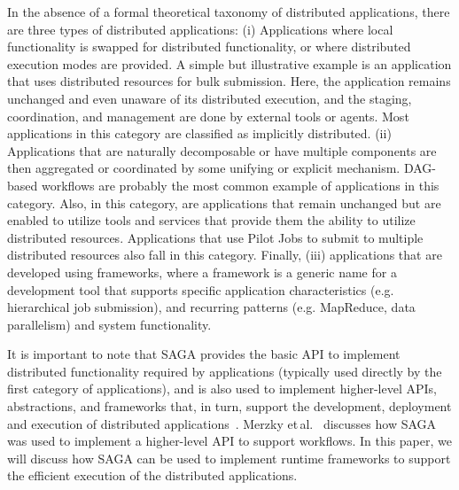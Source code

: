     In the absence of a formal theoretical taxonomy of distributed
    applications, %
    there are three types of distributed applications: (i) Applications
    where local functionality is swapped for distributed functionality,
    or where distributed execution modes are provided.  A simple but
    illustrative example is an application that uses distributed
    resources for bulk submission. Here, the application remains
    unchanged and even unaware of its distributed execution, and the
    staging, coordination, and management are done by external tools or
    agents. Most applications in this category are classified as
    implicitly distributed.  (ii) Applications that are naturally
    decomposable or have multiple components are then aggregated or
    coordinated by some unifying or explicit mechanism.  DAG-based
    workflows are probably the most common example of applications in
    this category. Also, in this category, are applications that remain
    unchanged but are enabled to utilize tools and services that provide
    them the ability to utilize distributed resources.  Applications
    that use Pilot Jobs to submit to multiple distributed resources also
    fall in this category.  Finally, (iii) applications that are
    developed using frameworks, where a framework is a generic name for
    a development tool that supports specific application
    characteristics (e.g. hierarchical job submission), and recurring
    patterns (e.g. MapReduce, data parallelism) and system
    functionality.


    It is important to note that SAGA provides the basic API to
    implement distributed functionality required by applications
    (typically used directly by the first category of applications), and
    is also used to implement higher-level APIs, abstractions, and
    frameworks that, in turn, support the development, deployment and
    execution of distributed applications~\cite{enkf-gmac09}. Merzky
    et\,al.~\cite{sagamontage09} discusses how SAGA was used to
    implement a higher-level API to support workflows. In this paper, we
    will discuss how SAGA can be used to implement runtime frameworks to
    support the efficient execution of the distributed applications.

